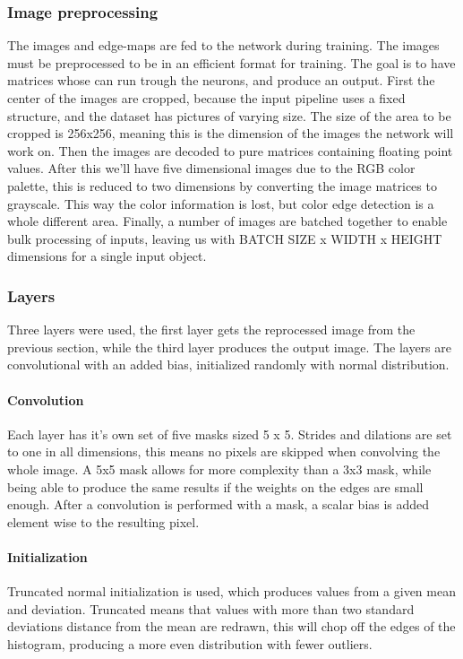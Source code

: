 \documentclass[a4paper,12pt]{article}
\begin{document}
\subsubsection{Image preprocessing}
The images and edge-maps are fed to the network during training. The images must be preprocessed to be in an efficient format for training. The goal is to have matrices whose can run trough the neurons, and produce an output. First the center of the images are cropped, because the input pipeline uses a fixed structure, and the dataset has pictures of varying size. The size of the area to be cropped is 256x256, meaning this is the dimension of the images the network will work on. Then the images are decoded to pure matrices containing floating point values. After this we'll have five dimensional images due to the RGB color palette, this is reduced to two dimensions by converting the image matrices to grayscale. This way the color information is lost, but color edge detection is a whole different area. Finally, a number of images are batched together to enable bulk processing of inputs, leaving us with BATCH SIZE x WIDTH x HEIGHT dimensions for a single input object.
\subsubsection{Layers}
Three layers were used, the first layer gets the reprocessed image from the previous section, while the third layer produces the output image. The layers are convolutional with an added bias, initialized randomly with normal distribution.\par
\paragraph{Convolution}
Each layer has it's own set of five masks sized 5 x 5. Strides and dilations are set to one in all dimensions, this means no pixels are skipped when convolving the whole image. A 5x5 mask allows for more complexity than a 3x3 mask, while being able to produce the same results if the weights on the edges are small enough. After a convolution is performed with a mask, a scalar bias is added element wise to the resulting pixel.
\paragraph{Initialization}
Truncated normal initialization is used, which produces values from a given mean and deviation. Truncated means that values with more than two standard deviations distance from the mean are redrawn, this will chop off the edges of the histogram, producing a more even distribution with fewer outliers.
\end{document}

